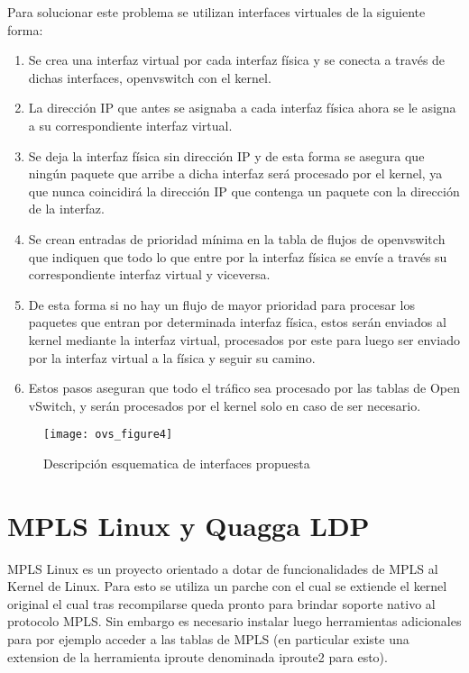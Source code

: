 \begin{enumerate}
Para solucionar este problema se utilizan interfaces virtuales de la siguiente forma:

\begin{enumerate}
\item Se crea una interfaz virtual por cada interfaz física y se conecta a través de dichas interfaces,  openvswitch con el kernel.

\item La dirección IP que antes se asignaba a cada interfaz física ahora se le asigna a su correspondiente interfaz virtual.

\item Se deja la interfaz física sin dirección IP y de esta forma se asegura que ningún paquete que arribe a dicha interfaz será procesado por el kernel, ya que nunca coincidirá la dirección IP que contenga un paquete con la dirección de la interfaz.

\item Se crean entradas de prioridad mínima en la tabla de flujos de openvswitch que indiquen que todo lo que entre por la interfaz física se envíe a través su correspondiente interfaz virtual y viceversa.

\item De esta forma si no hay un flujo de mayor prioridad para procesar los paquetes que entran por determinada interfaz física, estos serán enviados al kernel mediante la interfaz virtual, procesados por este para luego ser enviado por la interfaz virtual a la física y seguir su camino.

\item Estos pasos aseguran que todo el tráfico sea procesado por las tablas de Open vSwitch, y serán procesados por el kernel solo en caso de ser necesario.
\end{enumerate}

\begin{figure}[h] 
\centering    
\texttt{[image: ovs\_figure4]}
\caption[OVSInterfaces2]{Descripci\'on esquematica de interfaces propuesta}
\label{fig:OVSInterfaces2}
\end{figure}

\end{enumerate}

\section{MPLS Linux y Quagga LDP}
\label{apendiceB6}

MPLS Linux\cite{MplsLinux1} es un proyecto orientado a dotar de funcionalidades de MPLS al Kernel de Linux. 
Para esto se utiliza un parche con el cual se extiende el kernel original el cual tras recompilarse queda pronto para brindar soporte nativo al protocolo MPLS. Sin embargo es necesario instalar luego herramientas adicionales para por ejemplo acceder a las tablas de MPLS (en particular existe una extension de la herramienta iproute denominada iproute2 para esto).\\

